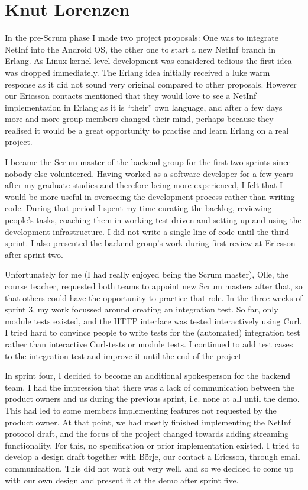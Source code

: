 \section{Knut Lorenzen}

In the pre-Scrum phase I made two project proposals: One was to integrate NetInf into the Android OS, the other one to start a new NetInf branch in Erlang. As Linux kernel level development was considered tedious the first idea was dropped immediately. The Erlang idea initially received a luke warm response as it did not sound very original compared to other proposals. However our Ericsson contacts mentioned that they would love to see a NetInf implementation in Erlang as it is ``their'' own language, and after a few days more and more group members changed their mind, perhaps because they realised it would be a great opportunity to practise and learn Erlang on a real project.

I became the Scrum master of the backend group for the first two sprints since nobody else volunteered. Having worked as a software developer for a few years after my graduate studies and therefore being more experienced, I felt that I would be more useful in overseeing the development process rather than writing code. During that period I spent my time curating the backlog, reviewing people's tasks, coaching them in working test-driven and setting up and using the development infrastructure. I did not write a single line of code until the third sprint. I also presented the backend group's work during first review at Ericsson after sprint two.

Unfortunately for me (I had really enjoyed being the Scrum master), Olle, the course teacher, requested both teams to appoint new Scrum masters after that, so that others could have the opportunity to practice that role. In the three weeks of sprint 3, my work focussed around creating an integration test. So far, only module tests existed, and the HTTP interface was tested interactively using Curl. I tried hard to convince people to write tests for the (automated) integration test rather than interactive Curl-tests or module tests. I continued to add test cases to the integration test and improve it until the end of the project

In sprint four, I decided to become an additional spokesperson for the backend team. I had the impression that there was a lack of communication between the product owners and us during the previous sprint, i.e. none at all until the demo. This had led to some members implementing features not requested by the product owner. At that point, we had mostly finished implementing the NetInf protocol draft, and the focus of the project changed towards adding streaming functionality. For this, no specification or prior implementation existed. I tried to develop a design draft together with B\"orje, our contact a Ericsson, through email communication. This did not work out very well, and so we decided to come up with our own design and present it at the demo after sprint five.
